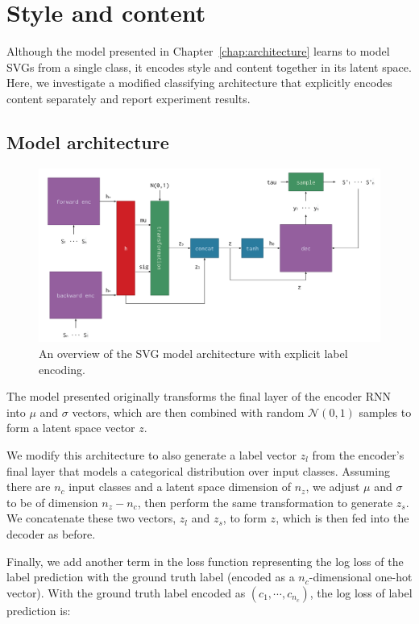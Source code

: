 \chapter{Style and content}\label{chap:style}
Although the model presented in Chapter~\ref{chap:architecture} learns to model SVGs from a single class, it encodes style and content together in its latent space.
Here, we investigate a modified classifying architecture that explicitly encodes content separately and report experiment results.

\section{Model architecture}
\begin{figure}[h]
\centering
\caption[An overview of the SVG model architecture with explicit label encoding]{An overview of the SVG model architecture with explicit label encoding.
\label{fig:label-arch}}
\includegraphics[width=\textwidth]{figures/label_architecture}
\end{figure}

The model presented originally transforms the final layer of the encoder RNN into $\mu$ and $\sigma$ vectors, which are then combined with random $\mathcal{N}(0,1)$ samples to form a latent space vector $z$.

We modify this architecture to also generate a label vector $z_l$ from the encoder's final layer that models a categorical distribution over input classes.
Assuming there are $n_c$ input classes and a latent space dimension of $n_z$, we adjust $\mu$ and $\sigma$ to be of dimension $n_z - n_c$, then perform the same transformation to generate $z_s$.
We concatenate these two vectors, $z_l$ and $z_s$, to form $z$, which is then fed into the decoder as before.

Finally, we add another term in the loss function representing the log loss of the label prediction with the ground truth label (encoded as a $n_c$-dimensional one-hot vector).
With the ground truth label encoded as $(c_1, \cdots, c_{n_c})$, the log loss of label prediction is:

